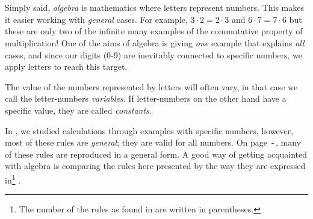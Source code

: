 



\section{\algintro}
Simply said, \textit{algebra} is mathematics where letters represent numbers. This makes it easier working with \textsl{general} cases. For example, $ 3\cdot 2=2\cdot3 $ and $ {6\cdot7=7\cdot6} $ but these are only two of the infinite many examples of the commutative property of multiplication! One of the aims of algebra is giving \textsl{one} example that explains \textsl{all} cases, and since our digits (0-9) are inevitably connected to specific numbers, we apply letters to reach this target. \vsk

The value of the numbers represented by letters will often vary, in that case we call the letter-numbers \textit{variables}. If letter-numbers on the other hand have a specific value, they are called \textit{constants}.

\vsk

In , we studied calculations through examples with specific numbers, however, most of these rules are \textsl{general}; they are valid for all numbers. On page \pageref{regstart}\,-\,\pageref{regslutt}, many of these rules are reproduced in a general form. A good way of getting acquainted with algebra is comparing the rules here presented by the way they are expressed in\footnote{The number of the rules as found in  are written in parentheses.} . \vsk

\regv
\label{regstart}
\reg[\adkom\;(\ref{adkom}) \label{adkomalg}]{\vs
\[ a+ b =b+a \]
}
\eks{ \vsb
\[ 7+ 5=5+7 \]
} \vsk \vsk

\reg[\gangkom\;(\ref{gangkom})]{\vs
	\[ a\cdot b =b\cdot a \]
}
\eks[1]{ \vsb
	\[ 9\cdot 8=8\cdot9 \]
}
\eks[2]{ \vsb
\[  8\cdot a= a\cdot 8  \]
}
\newpage
{}
\vsk 

\reg[\brdef\;(\ref{brdef})]{
\[ a:b=\frac{a}{b} \]
}
\eks[]{ \vs
\[a:2= \frac{a}{2} \]
}
 \vsk 

